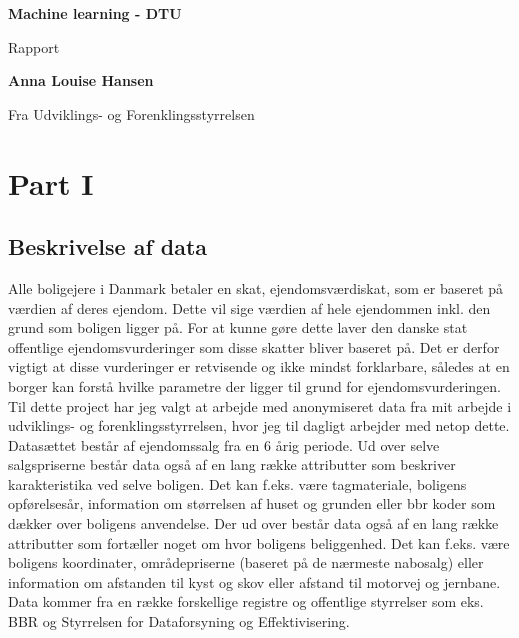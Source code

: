 \documentclass{report}
\begin{document}


\begin{titlepage}
    \begin{center}
        \vspace*{1cm}
 
        \Huge
        \textbf{Machine learning - DTU}
 
        \vspace{0.5cm}
        \LARGE
        Rapport 
 
        \vspace{1.5cm}
 
        \textbf{Anna Louise Hansen}
        \vfill
 
        Fra Udviklings- og Forenklingsstyrrelsen
 
        \vspace{0.8cm}
 
    \end{center}
\end{titlepage}



\chapter{Part I}

\section{Beskrivelse af data}
Alle boligejere i Danmark betaler en skat, ejendomsværdiskat, som er baseret på værdien af deres ejendom. Dette vil sige værdien af hele ejendommen inkl. den grund som boligen ligger på. For at kunne gøre dette laver den danske stat offentlige ejendomsvurderinger som disse skatter bliver baseret på. 
Det er derfor vigtigt at disse vurderinger er retvisende og ikke mindst forklarbare, således at en borger kan forstå hvilke parametre der ligger til grund for ejendomsvurderingen. 
Til dette project har jeg valgt at arbejde med anonymiseret data fra mit arbejde i udviklings- og forenklingsstyrrelsen, hvor jeg til dagligt arbejder med netop dette. Datasættet består af ejendomssalg fra en 6 årig periode. Ud over selve salgspriserne består data også af en lang række attributter som beskriver karakteristika ved selve boligen. Det kan f.eks. være tagmateriale, boligens opførelsesår, information om størrelsen af huset og grunden eller bbr koder som dækker over boligens anvendelse. 
Der ud over består data også af en lang række attributter som fortæller noget om hvor boligens beliggenhed. Det kan f.eks. være boligens koordinater, områdepriserne (baseret på de nærmeste nabosalg) eller information om afstanden til kyst og skov eller afstand til motorvej og jernbane. 
Data kommer fra en række forskellige registre og offentlige styrrelser som eks. BBR og Styrrelsen for Dataforsyning og Effektivisering.
\end{document}
